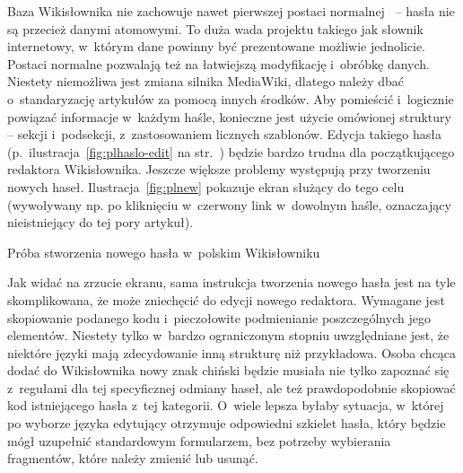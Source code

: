 Baza Wikisłownika nie zachowuje nawet pierwszej postaci normalnej~\cite{book:introduction} -- hasła nie są przecież danymi atomowymi. To duża wada projektu takiego jak słownik internetowy, w~którym dane powinny być prezentowane możliwie jednolicie. Postaci normalne pozwalają też na łatwiejszą modyfikację i~obróbkę danych. Niestety niemożliwa jest zmiana silnika MediaWiki, dlatego należy dbać o~standaryzację artykułów za pomocą innych środków. Aby pomieścić i~logicznie powiązać informacje w~każdym haśle, konieczne jest użycie omówionej struktury -- sekcji i~podsekcji, z~zastosowaniem licznych szablonów. Edycja takiego hasła (p.~ilustracja~\ref{fig:plhaslo-edit} na str.~\pageref{fig:plhaslo-edit}) będzie bardzo trudna dla początkującego redaktora Wikisłownika. Jeszcze większe problemy występują przy tworzeniu nowych haseł. Ilustracja~\ref{fig:plnew} pokazuje ekran służący do tego celu (wywoływany np. po kliknięciu w~czerwony link w~dowolnym haśle, oznaczający nieistniejący do tej pory artykuł).

\begin{illustration}
	\caption{Próba stworzenia nowego hasła w~polskim Wikisłowniku}
	\label{fig:plnew}
\end{illustration}

Jak widać na zrzucie ekranu, sama instrukcja tworzenia nowego hasła jest na tyle skomplikowana, że może zniechęcić do edycji nowego redaktora. Wymagane jest skopiowanie podanego kodu i~pieczołowite podmienianie poszczególnych jego elementów. Niestety tylko w~bardzo ograniczonym stopniu uwzględniane jest, że niektóre języki mają zdecydowanie inną strukturę niż przykładowa. Osoba chcąca dodać do Wikisłownika nowy znak chiński będzie musiała nie tylko zapoznać się z~regułami dla tej specyficznej odmiany haseł, ale też prawdopodobnie skopiować kod istniejącego hasła z~tej kategorii. O~wiele lepsza byłaby sytuacja, w~której po wyborze języka edytujący otrzymuje odpowiedni szkielet hasła, który będzie mógł uzupełnić standardowym formularzem, bez potrzeby wybierania fragmentów, które należy zmienić lub usunąć.

